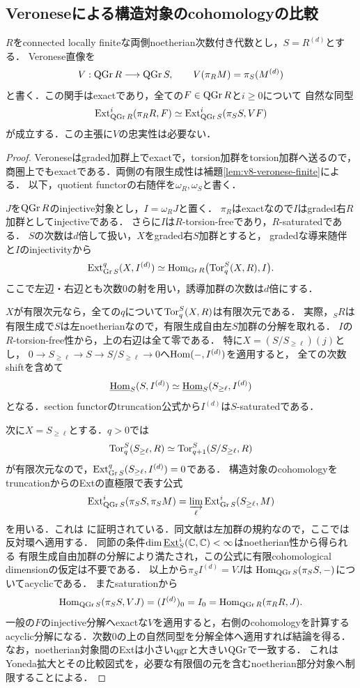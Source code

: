 \documentclass[11pt,a4paper]{ltjsarticle}
\begin{document}
\subsection{Veroneseによる構造対象のcohomologyの比較}

\begin{lemma}[有限Veroneseとcohomology]\label{lem:v8-veronese-cohomology}
$R$をconnected locally finiteな両側noetherian次数付き代数とし，$S=R^{(d)}$とする．
Veronese直像を
\[
 V:\operatorname{QGr} R\longrightarrow\operatorname{QGr} S,
 \qquad V(\pi_RM)=\pi_S(M^{(d)})
\]
と書く．この関手はexactであり，全ての$F\in\operatorname{QGr} R$と$i\ge0$について
自然な同型
\[
 \operatorname{Ext}^i_{\operatorname{QGr} R}(\pi_RR,F)
 \simeq
 \operatorname{Ext}^i_{\operatorname{QGr} S}(\pi_SS,VF)
\]
が成立する．この主張に$V$の忠実性は必要ない．
\end{lemma}
\begin{proof}
Veroneseはgraded加群上でexactで，torsion加群をtorsion加群へ送るので，
商圏上でもexactである．両側の有限生成性は補題\ref{lem:v8-veronese-finite}による．
以下，quotient functorの右随伴を$\omega_R,\omega_S$と書く．

$J$を$\operatorname{QGr} R$のinjective対象とし，$I=\omega_RJ$と置く．
$\pi_R$はexactなので$I$はgraded右$R$加群としてinjectiveである．
さらに$I$は$R$-torsion-freeであり，$R$-saturatedである．
$S$の次数は$d$倍して扱い，$X$をgraded右$S$加群とすると，
gradedな導来随伴と$I$のinjectivityから
\[
 \operatorname{Ext}^q_{\operatorname{Gr} S}(X,I^{(d)})
 \simeq
 \operatorname{Hom}_{\operatorname{Gr} R}\bigl(\operatorname{Tor}_q^S(X,R),I\bigr).
\]
ここで左辺・右辺とも次数$0$の射を用い，誘導加群の次数は$d$倍にする．

$X$が有限次元なら，全ての$q$について$\operatorname{Tor}_q^S(X,R)$は有限次元である．
実際，${}_SR$は有限生成で$S$は左noetherianなので，有限生成自由左$S$加群の分解を取れる．
$I$の$R$-torsion-free性から，上の右辺は全て零である．
特に$X=(S/S_{\ge\ell})(j)$とし，
$0\to S_{\ge\ell}\to S\to S/S_{\ge\ell}\to0$へ$\operatorname{Hom}(-,I^{(d)})$を適用すると，
全ての次数shiftを含めて
\[
 \underline{\operatorname{Hom}}_S(S,I^{(d)})
 \simeq\underline{\operatorname{Hom}}_S(S_{\ge\ell},I^{(d)})
\]
となる．section functorのtruncation公式から$I^{(d)}$は$S$-saturatedである．

次に$X=S_{\ge\ell}$とする．$q>0$では
\[
 \operatorname{Tor}_q^S(S_{\ge\ell},R)
 \simeq \operatorname{Tor}_{q+1}^S(S/S_{\ge\ell},R)
\]
が有限次元なので，$\operatorname{Ext}^q_{\operatorname{Gr} S}(S_{\ge\ell},I^{(d)})=0$である．
構造対象のcohomologyをtruncationからのExtの直極限で表す公式
\[
 \operatorname{Ext}^i_{\operatorname{QGr} S}(\pi_SS,\pi_SM)
 =\varinjlim_{\ell}
   \operatorname{Ext}^i_{\operatorname{Gr} S}(S_{\ge\ell},M)
\]
を用いる．これは\cite[\S4.1, (4.1), Lemmas 4.1.4--4.1.6]{BvdBGenerators}
に証明されている．同文献は左加群の規約なので，ここでは反対環へ適用する．
同節の条件$\dim\underline{\operatorname{Ext}}^i_S(\mathbb C,\mathbb C)<\infty$はnoetherian性から得られる
有限生成自由加群の分解により満たされ，この公式に有限cohomological dimensionの仮定は不要である．
以上から$\pi_S I^{(d)}=VJ$は
$\operatorname{Hom}_{\operatorname{QGr} S}(\pi_SS,-)$についてacyclicである．
またsaturationから
\[
 \operatorname{Hom}_{\operatorname{QGr} S}(\pi_SS,VJ)
 =(I^{(d)})_0=I_0
 =\operatorname{Hom}_{\operatorname{QGr} R}(\pi_RR,J).
\]
一般の$F$のinjective分解へexactな$V$を適用すると，右側のcohomologyを計算する
acyclic分解になる．次数$0$の上の自然同型を分解全体へ適用すれば結論を得る．
なお，noetherian対象間のExtは小さい$\operatorname{qgr}$と大きい$\operatorname{QGr}$で一致する．
これはYoneda拡大とその比較図式を，必要な有限個の元を含むnoetherian部分対象へ制限することによる．
\end{proof}
\end{document}
